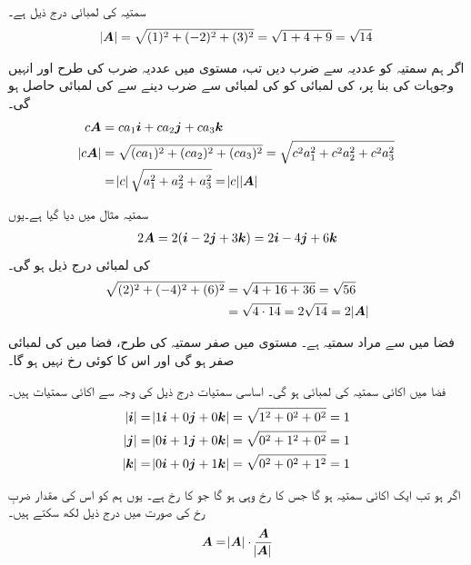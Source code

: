سمتیہ  کی لمبائی درج ذیل ہے۔
\begin{align*}
\abs{{{\boldsymbol{A}}}}=\sqrt{(1)^2+(-2)^2+(3)^2}=\sqrt{1+4+9}=\sqrt{14}
\end{align*}

اگر ہم سمتیہ  کو عددیہ  سے ضرب دیں تب، مستوی میں عددیہ ضرب کی طرح اور انہیں وجوہات کی بنا پر،      کی لمبائی کو   کی لمبائی سے ضرب دینے سے  کی لمبائی  حاصل ہو گی۔
\begin{gather}
\begin{aligned}
c{{\boldsymbol{A}}}&=ca_1{\boldsymbol{i}}+ca_2{\boldsymbol{j}}+ca_3{\boldsymbol{k}}\\
\abs{c{{\boldsymbol{A}}}}&=\sqrt{(ca_1)^2+(ca_2)^2+(ca_3)^2}=\sqrt{c^2a_1^2+c^2a_2^2+c^2a_3^2}\\
&=\abs{c}\sqrt{a_1^2+a_2^2+a_3^2}=\abs{c}\abs{{{\boldsymbol{A}}}}
\end{aligned}
\end{gather}

سمتیہ  مثال  میں دیا گیا ہے۔یوں 
\begin{align*}
2{{\boldsymbol{A}}}=2({\boldsymbol{i}}-2{\boldsymbol{j}}+3{\boldsymbol{k}})=2{\boldsymbol{i}}-4{\boldsymbol{j}}+6{\boldsymbol{k}}
\end{align*}
کی لمبائی درج ذیل ہو گی۔
\begin{align*}
\sqrt{(2)^2+(-4)^2+(6)^2}&=\sqrt{4+16+36}=\sqrt{56}\\
&=\sqrt{4\cdot 14}=2\sqrt{14}=2\abs{{{\boldsymbol{A}}}}
\end{align*}

فضا میں  سے مراد سمتیہ  ہے۔ مستوی میں صفر سمتیہ کی طرح،  فضا میں  کی لمبائی صفر ہو گی اور اس کا کوئی رخ نہیں ہو گا۔

فضا میں اکائی سمتیہ کی لمبائی  ہو گی۔ اساسی سمتیات درج ذیل کی وجہ سے اکائی سمتیات ہیں۔
\begin{align*}
\abs{{\boldsymbol{i}}}&=\abs{1{\boldsymbol{i}}+0{\boldsymbol{j}}+0{\boldsymbol{k}}}=\sqrt{1^2+0^2+0^2}=1\\
\abs{{\boldsymbol{j}}}&=\abs{0{\boldsymbol{i}}+1{\boldsymbol{j}}+0{\boldsymbol{k}}}=\sqrt{0^2+1^2+0^2}=1\\
\abs{{\boldsymbol{k}}}&=\abs{0{\boldsymbol{i}}+0{\boldsymbol{j}}+1{\boldsymbol{k}}}=\sqrt{0^2+0^2+1^2}=1
\end{align*}

اگر  ہو تب  ایک اکائی سمتیہ ہو گا جس کا رخ وہی ہو گا جو  کا رخ ہے۔ یوں ہم  کو اس کی مقدار ضربِ رخ کی صورت میں درج ذیل لکھ سکتے ہیں۔
\begin{align}\label{مساوات_سمتیہ_فضا_لمبائی_ضرب_رخ}
{\ensuremath{{\boldsymbol{A}}}}=\abs{{{\boldsymbol{A}}}}\cdot\frac{{{\boldsymbol{A}}}}{\abs{{{\boldsymbol{A}}}}}
\end{align}

